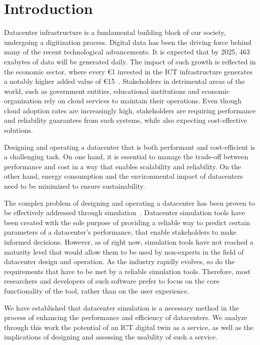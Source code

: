 \section{Introduction} \label{sec:introduction}

Datacenter infrastructure is a fundamental building block of our society, undergoing a digitization process.
Digital data has been the driving force behind many of the recent technological advancements.
It is expected that by 2025, 463 exabytes of data will be generated daily.
The impact of such growth is reflected in the economic sector, where every \euro 1 invested in the ICT infrastructure generates a notably higher added value of \euro 15~\cite{iosup2022future}.
Stakeholders in detrimental areas of the world, such as government entities, educational institutions and economic organization rely on cloud services to maintain their operations.
Even though cloud adoption rates are increasingly high, stakeholders are requiring performance and reliability guarantees from such systems, while also expecting cost-effective solutions.

Designing and operating a datacenter that is both performant and cost-efficient is a challenging task.
On one hand, it is essential to manage the trade-off between performance and cost in a way that enables scalability and reliability.
On the other hand, energy consumption and the environmental impact of datacenters need to be minimized to ensure sustainability.

The complex problem of designing and operating a datacenter has been proven to be effectively addressed through simulation~\cite{DBLP:conf/ccgrid/MastenbroekAI+21}.
Datacenter simulation tools have been created with the sole purpose of providing a reliable way to predict certain parameters of a datacenter's performance, that enable stakeholders to make informed decisions.
However, as of right now, simulation tools have not reached a maturity level that would allow them to be used by non-experts in the field of datacenter design and operation.
As the industry rapidly evolves, so do the requirements that have to be met by a reliable simulation tools.
Therefore, most researchers and developers of such software prefer to focus on the core functionality of the tool, rather than on the user experience.

We have established that datacenter simulation is a necessary method in the process of enhancing the performance and efficiency of datacenters. %
We analyze through this work the potential of an ICT digital twin as a service, as well as the implications of designing and assessing the usability of such a service.